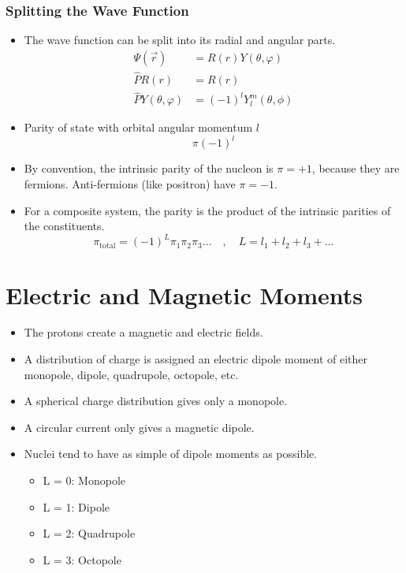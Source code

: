 \documentclass{article}
\begin{document}
\subsubsection{Splitting the Wave Function}
\begin{itemize}
    \item The wave function can be split into its radial and angular parts.
    \begin{align}
    Ψ(\vec{r}) &= R(r)Y(\theta, φ) \\
    \hat{P}R(r) &= R(r) \\
    \hat{P}Y(\theta, φ) &= (-1)^lY_{l}^{m}(θ, ϕ)
    \end{align} 
    \item Parity of state with orbital angular momentum $l$ 
    \begin{equation}
    π(-1)^{l}
    \end{equation} 
    \item By convention, the intrinsic parity of the nucleon is $π = +1$, because they are fermions. Anti-fermions (like positron) have $π = -1$.
    \item For a composite system, the parity is the product of the intrinsic parities of the constituents.
    \begin{equation}
      π_{\text{total}} = (-1)^{L}π_1π_2π_3 \ldots \quad , \quad  L = l_1 + l_2 + l_3 + \ldots
    \end{equation}
\end{itemize}

\section{Electric and Magnetic Moments}
\begin{itemize}
    \item The protons create a magnetic and electric fields. 
    \item A distribution of charge is assigned an electric dipole moment of either monopole, dipole, quadrupole, octopole, etc.
    \item A spherical charge distribution gives only a monopole. 
    \item A circular current only gives a magnetic dipole. 
    \item Nuclei tend to have as simple of dipole moments as possible. 
    \begin{itemize}
        \item L = 0: Monopole
        \item L = 1: Dipole
        \item L = 2: Quadrupole
        \item L = 3: Octopole
    \end{itemize}
\end{itemize}
\end{document}
